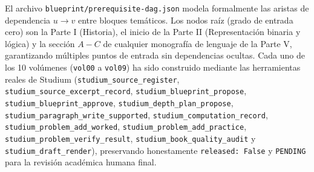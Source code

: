 \documentclass{book}
\begin{document}
El archivo \texttt{blueprint/prerequisite-dag.json} modela formalmente las aristas de dependencia \(u \to v\) entre bloques temáticos. Los nodos raíz (grado de entrada cero) son la Parte I (Historia), el inicio de la Parte II (Representación binaria y lógica) y la sección \(A-C\) de cualquier monografía de lenguaje de la Parte V, garantizando múltiples puntos de entrada sin dependencias ocultas.
Cada uno de los 10 volúmenes (\texttt{vol00} a \texttt{vol09}) ha sido construido mediante las herramientas reales de Studium (\texttt{studium\_source\_register}, \texttt{studium\_source\_excerpt\_record}, \texttt{studium\_blueprint\_propose}, \texttt{studium\_blueprint\_approve}, \texttt{studium\_depth\_plan\_propose}, \texttt{studium\_paragraph\_write\_supported}, \texttt{studium\_computation\_record}, \texttt{studium\_problem\_add\_worked}, \texttt{studium\_problem\_add\_practice}, \texttt{studium\_problem\_verify\_result}, \texttt{studium\_book\_quality\_audit} y \texttt{studium\_draft\_render}), preservando honestamente \texttt{released: False} y \texttt{PENDING} para la revisión académica humana final.
\end{document}
